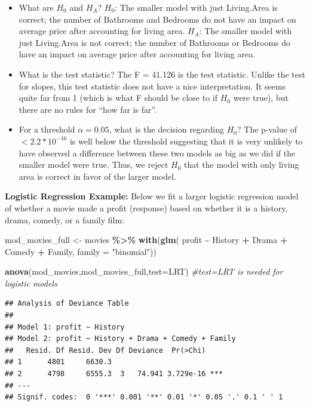 \documentclass[
]{book}
\newenvironment{Shaded}{\begin{snugshade}}{\end{snugshade}}
\newcommand{\AttributeTok}[1]{\textcolor[rgb]{0.13,0.29,0.53}{#1}}
\newcommand{\CommentTok}[1]{\textcolor[rgb]{0.56,0.35,0.01}{\textit{#1}}}
\newcommand{\FunctionTok}[1]{\textcolor[rgb]{0.13,0.29,0.53}{\textbf{#1}}}
\newcommand{\NormalTok}[1]{#1}
\newcommand{\OtherTok}[1]{\textcolor[rgb]{0.56,0.35,0.01}{#1}}
\newcommand{\SpecialCharTok}[1]{\textcolor[rgb]{0.81,0.36,0.00}{\textbf{#1}}}
\newcommand{\StringTok}[1]{\textcolor[rgb]{0.31,0.60,0.02}{#1}}
\begin{document}
\begin{itemize}
\item
  What are \(H_0\) and \(H_A\)?
  \(H_0\): The smaller model with just Living.Area is correct; the number of Bathrooms and Bedrooms do not have an impact on average price after accounting for living area.
  \(H_A\): The smaller model with just Living.Area is not correct; the number of Bathrooms or Bedrooms do have an impact on average price after accounting for living area.
\item
  What is the test statistic?
  The F = 41.126 is the test statistic. Unlike the test for slopes, this test statistic does not have a nice interpretation. It seems quite far from 1 (which is what F should be close to if \(H_0\) were true), but there are no rules for ``how far is far''.
\item
  For a threshold \(\alpha = 0.05\), what is the decision regarding \(H_0\)?
  The p-value of \(< 2.2*10^{-16}\) is well below the threshold suggesting that it is very unlikely to have observed a difference between these two models as big as we did if the smaller model were true. Thus, we reject \(H_0\) that the model with only living area is correct in favor of the larger model.
\end{itemize}

\textbf{Logistic Regression Example:} Below we fit a larger logistic regression model of whether a movie made a profit (response) based on whether it is a history, drama, comedy, or a family film:

\begin{Shaded}
\begin{Highlighting}[]
\NormalTok{mod\_movies\_full }\OtherTok{\textless{}{-}}\NormalTok{ movies }\SpecialCharTok{\%\textgreater{}\%}
  \FunctionTok{with}\NormalTok{(}\FunctionTok{glm}\NormalTok{( profit }\SpecialCharTok{\textasciitilde{}}\NormalTok{ History }\SpecialCharTok{+}\NormalTok{ Drama }\SpecialCharTok{+}\NormalTok{ Comedy }\SpecialCharTok{+}\NormalTok{ Family, }\AttributeTok{family =} \StringTok{"binomial"}\NormalTok{))}

\FunctionTok{anova}\NormalTok{(mod\_movies,mod\_movies\_full,}\AttributeTok{test=}\StringTok{\textquotesingle{}LRT\textquotesingle{}}\NormalTok{) }\CommentTok{\#test=\textquotesingle{}LRT\textquotesingle{} is needed for logistic models}
\end{Highlighting}
\end{Shaded}

\begin{verbatim}
## Analysis of Deviance Table
## 
## Model 1: profit ~ History
## Model 2: profit ~ History + Drama + Comedy + Family
##   Resid. Df Resid. Dev Df Deviance  Pr(>Chi)    
## 1      4801     6630.3                          
## 2      4798     6555.3  3   74.941 3.729e-16 ***
## ---
## Signif. codes:  0 '***' 0.001 '**' 0.01 '*' 0.05 '.' 0.1 ' ' 1
\end{verbatim}
\end{document}
